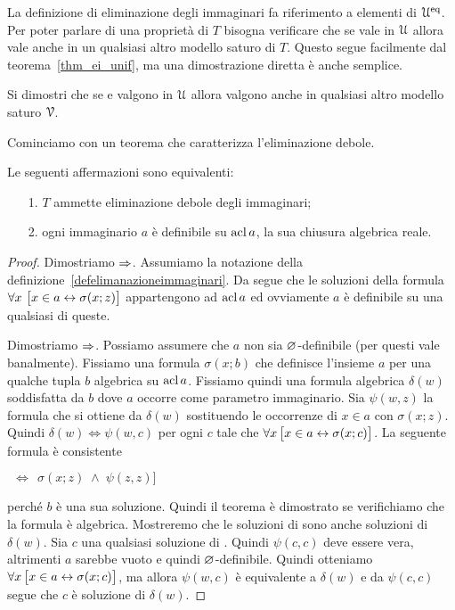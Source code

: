 La definizione di eliminazione degli immaginari fa riferimento a elementi di $\EuScript U^{\rm eq}$. Per poter parlare di una propriet\`a di $T$ bisogna verificare che se vale in $\EuScript U$ allora vale anche in un qualsiasi altro modello saturo di $T$. Questo segue facilmente dal teorema~\ref{thm_ei_unif}, ma una dimostrazione diretta \`e anche semplice.

\begin{exercise}
Si dimostri che se  e  valgono in $\EuScript U$ allora valgono anche in qualsiasi altro modello saturo $\EuScript V$.\QED
\end{exercise}

Cominciamo con un teorema che caratterizza l'eliminazione debole. 

\begin{theorem}\label{elimimd} 
Le seguenti affermazioni sono equivalenti:
\begin{itemize}
\item[1.] $T$ ammette eliminazione debole degli immaginari;
\item[2.] ogni immaginario $a$ \`e definibile su $\mathop{\rm acl} a$, la sua chiusura algebrica reale.
\end{itemize}
\end{theorem}


\begin{proof}
Dimostriamo $\Rightarrow$. Assumiamo la notazione della definizione~\ref{defelimanazioneimmaginari}. Da  segue che le soluzioni della formula $\A x\ \big[x\in a \iff \sigma(x;z)\big]$ appartengono ad $\mathop{\rm acl} a$ ed ovviamente $a$ \`e definibile su una qualsiasi di queste.

Dimostriamo $\Rightarrow$. Possiamo assumere che $a$ non sia $\varnothing$-definibile (per questi  vale banalmente). Fissiamo una formula $\sigma(x;b)$ che definisce l'insieme $a$ per una qualche tupla $b$ algebrica su $\mathop{\rm acl} a$. Fissiamo quindi una formula algebrica $\delta(w)$ soddisfatta da $b$ dove $a$ occorre come parametro immaginario. Sia  $\psi(w,z)$ la formula che si ottiene da $\delta(w)$ sostituendo le occorrenze di $x\in a$ con  $\sigma(x;z)$. Quindi $\delta(w)\iff\psi(w,c)$ per ogni $c$ tale che $\forall x\,\big[ x\in a\leftrightarrow \sigma(x;c)\big]$. La seguente formula \`e consistente

\parbox{30ex}{}\llap{$\A x\ \Big[x\in a$}$\ \ \iff\ \ \sigma(x;z)\;\wedge\; \psi(z,z)\Big]$

perch\'e $b$ \`e una sua soluzione. Quindi il teorema \`e dimostrato se verifichiamo che la formula  \`e algebrica. Mostreremo che le soluzioni di  sono anche soluzioni di $\delta(w)$. Sia $c$ una qualsiasi soluzione di . Quindi $\psi(c,c)$ deve essere vera, altrimenti $a$ sarebbe vuoto e quindi $\varnothing$-definibile. Quindi otteniamo $\forall x\,\big[x\in a \leftrightarrow \sigma(x;c)\big]$, ma allora $\psi(w,c)$ \`e equivalente a $\delta(w)$ e da $\psi(c,c)$ segue che $c$ \`e soluzione di $\delta(w)$.
\end{proof}


